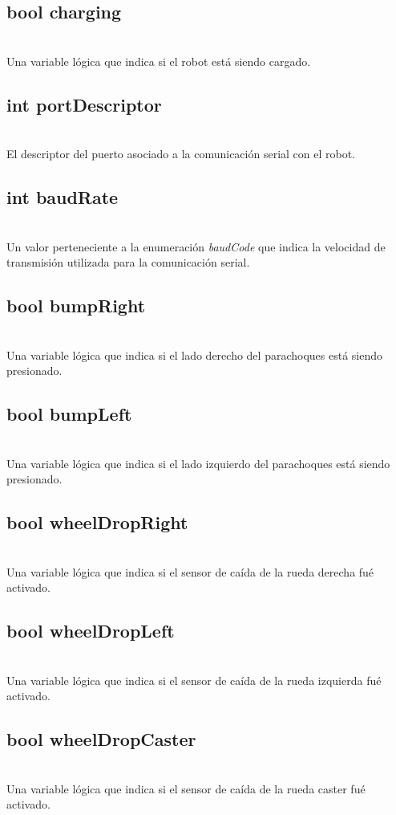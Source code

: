\documentclass[letterpaper]{book}
\begin{document}
\subsection{bool charging}\mbox{}\\
Una variable lógica que indica si el robot está siendo cargado.
\subsection{int portDescriptor}\mbox{}\\
El descriptor del puerto asociado a la comunicación serial con el robot.
\subsection{int baudRate}\mbox{}\\
Un valor perteneciente a la enumeración \emph{baudCode} que indica la velocidad de transmisión utilizada para la comunicación serial.
\subsection{bool bumpRight}\mbox{}\\
Una variable lógica que indica si el lado derecho del parachoques está siendo presionado.
\subsection{bool bumpLeft}\mbox{}\\
Una variable lógica que indica si el lado izquierdo del parachoques está siendo presionado.
\subsection{bool wheelDropRight}\mbox{}\\
Una variable lógica que indica si el sensor de caída de la rueda derecha fué activado.
\subsection{bool wheelDropLeft}\mbox{}\\
Una variable lógica que indica si el sensor de caída de la rueda izquierda fué activado.
\subsection{bool wheelDropCaster}\mbox{}\\
Una variable lógica que indica si el sensor de caída de la rueda caster fué activado.
\end{document}

